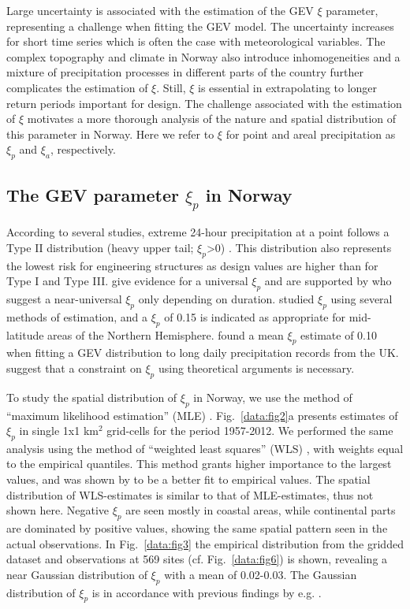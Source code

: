 \documentclass[12pt,a4paper,english]{article}
\begin{document}
Large uncertainty is associated with the estimation of the GEV $\xi$ parameter, representing a challenge when fitting the GEV model. The uncertainty increases for short time series which is often the case with meteorological variables. The complex topography and climate in Norway also introduce inhomogeneities and a mixture of precipitation processes in different parts of the country further complicates the estimation of $\xi$. Still, $\xi$ is essential in extrapolating to longer return periods important for design. The challenge associated with the estimation of $\xi$ motivates a more thorough analysis of the nature and spatial distribution of this parameter in Norway. Here we refer to $\xi$ for point and areal precipitation as $\xi_{p}$ and $\xi_{a}$, respectively.

\subsection{The GEV parameter $\xi_{p}$ in Norway}
 
According to several studies, extreme 24-hour precipitation at a point follows a Type II distribution (heavy upper tail; $\xi_{p}$>0) \citep{Wilks1993,KoutsoyiannisandBaloutsos2000,Katzetal2002,Colesetal2003,ColesandPericchi2003,Koutsoyiannis2004a}. This distribution also represents the lowest risk for engineering structures as design values are higher than for Type I and Type III. \cite{WilsonandToumi2005} give evidence for a universal $\xi_{p}$ and are supported by \cite{Venezianoetal2009} who suggest a near-universal $\xi_{p}$ only depending on duration. \cite{Koutsoyiannis2004b} studied $\xi_{p}$ using several methods of estimation, and a $\xi_{p}$ of 0.15 is indicated as appropriate for mid-latitude areas of the Northern Hemisphere. \cite{WilsonandToumi2005} found a mean $\xi_{p}$ estimate of 0.10 when fitting a GEV distribution to long daily precipitation records from the UK. \cite{Venezianoetal2009} suggest that a constraint on $\xi_{p}$ using theoretical arguments is necessary.  

To study the spatial distribution of $\xi_{p}$ in Norway, we use the method of ``maximum likelihood estimation'' (MLE) \citep{PrescottandWalden1980}. Fig.~\ref{data:fig2}a presents estimates of $\xi_{p}$ in single 1x1 km$^2$ grid-cells for the period 1957-2012. We performed the same analysis using the method of ``weighted least squares'' (WLS) \citep{Koutsoyiannis2004b}, with weights equal to the empirical quantiles. This method grants higher importance to the largest values, and was shown by \cite{Koutsoyiannis2004b} to be a better fit to empirical values. The spatial distribution of WLS-estimates is similar to that of MLE-estimates, thus not shown here. Negative $\xi_{p}$ are seen mostly in coastal areas, while continental parts are dominated by positive values, showing the same spatial pattern seen in the actual observations. In Fig.~\ref{data:fig3} the empirical distribution from the gridded dataset and observations at 569 sites (cf. Fig.~\ref{data:fig6}) is shown, revealing a near Gaussian distribution of $\xi_{p}$ with a mean of 0.02-0.03. The Gaussian distribution of $\xi_{p}$ is in accordance with previous findings by e.g. \cite{PapalexiouandKoutsoyiannis2013}.  
\end{document}

